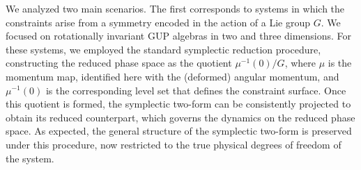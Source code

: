 \documentclass{article}
\numberwithin{equation}{section}
\theoremstyle{definition}
\begin{document}
\smallskip

We analyzed two main scenarios. The first corresponds to systems in which the constraints arise from a symmetry encoded in the action of a Lie group $G$. We focused on rotationally invariant GUP algebras in two and three dimensions. For these systems, we employed the standard symplectic reduction procedure, constructing the reduced phase space as the quotient $\mu^{-1}(0)/G$, where $\mu$ is the momentum map, identified here with the (deformed) angular momentum, and $\mu^{-1}(0)$ is the corresponding level set that defines the constraint surface. Once this quotient is formed, the symplectic two-form can be consistently projected to obtain its reduced counterpart, which governs the dynamics on the reduced phase space. As expected, the general structure of the symplectic two-form is preserved under this procedure, now restricted to the true physical degrees of freedom of the system. 

\smallskip
\end{document}
